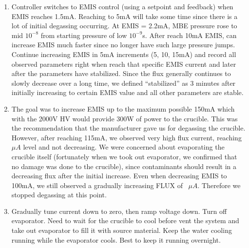 \begin{enumerate}
\item	Controller switches to EMIS control (using a setpoint and feedback) when EMIS reaches 1.5mA.  Reaching to 5mA will take some time since there is a lot of initial degassing occurring. At EMIS = 2.2mA, MBE pressure rose to mid $10^{-8}$ from starting pressure of low $10^{-9}$s. After reach 10mA EMIS, can increase EMIS much faster since no longer have such large pressure jumps. Continue increasing EMIS in 5mA increments (5, 10, 15mA) and record all observed parameters right when reach that specific EMIS current and later after the parameters have stabilized. Since the flux generally continues to slowly decrease over a long time, we defined “stabilized” as 3 minutes after initially increasing to certain EMIS value and all other parameters are stable.
\item	The goal was to increase EMIS up to the maximum possible 150mA which with the 2000V HV would provide 300W of power to the crucible. This was the recommendation that the manufacturer gave us for degassing the crucible. However, after reaching 115mA, we observed very high flux current, reaching $\mu A$ level and not decreasing. We were concerned about evaporating the crucible itself (fortunately when we took out evaporator, we confirmed that no damage was done to the crucible), since contaminants should result in a decreasing flux after the initial increase. Even when decreasing EMIS to 100mA, we still observed a gradually increasing FLUX of ~$\mu A$.  Therefore we stopped degassing at this point.
\item	Gradually tune current down to zero, then ramp voltage down. Turn off evaporator. Need to wait for the crucible to cool before vent the system and take out evaporator to fill it with source material. Keep the water cooling running while the evaporator cools. Best to keep it running overnight.
\end{enumerate}
